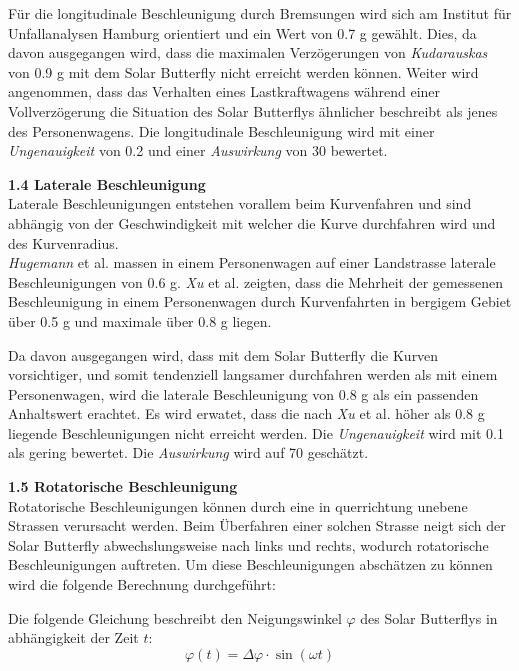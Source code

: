 \begin{description}
    Für die longitudinale Beschleunigung durch Bremsungen wird sich am Institut für Unfallanalysen Hamburg orientiert und ein Wert von 0.7 g gewählt. Dies, da davon ausgegangen wird, dass die maximalen Verzögerungen von \emph{Kudarauskas} von 0.9 g mit dem Solar Butterfly nicht erreicht werden können. Weiter wird angenommen, dass das Verhalten eines Lastkraftwagens während einer Vollverzögerung die Situation des Solar Butterflys ähnlicher beschreibt als jenes des Personenwagens.
    Die longitudinale Beschleunigung wird mit einer \emph{Ungenauigkeit} von 0.2 und einer \emph{Auswirkung} von 30 bewertet.

    \item \textbf{1.4 Laterale Beschleunigung}\\
    Laterale Beschleunigungen entstehen vorallem beim Kurvenfahren und sind abhängig von der Geschwindigkeit mit welcher die Kurve durchfahren wird und des Kurvenradius.\\
    \emph{Hugemann} et al. \cite{Kurv.1} massen in einem Personenwagen auf einer Landstrasse laterale Beschleunigungen von 0.6 g. \emph{Xu} et al. \cite{Kurv.2} zeigten, dass die Mehrheit der gemessenen Beschleunigung in einem Personenwagen durch Kurvenfahrten in bergigem Gebiet über 0.5 g und maximale über 0.8 g liegen.

    Da davon ausgegangen wird, dass mit dem Solar Butterfly die Kurven vorsichtiger, und somit tendenziell langsamer durchfahren werden als mit einem Personenwagen, wird die laterale Beschleunigung von 0.8 g als ein passenden Anhaltswert erachtet. Es wird erwatet, dass die nach \emph{Xu} et al. höher als 0.8 g liegende Beschleunigungen nicht erreicht werden. Die \emph{Ungenauigkeit} wird mit 0.1 als gering bewertet. Die \emph{Auswirkung} wird auf 70 geschätzt.

    \item \textbf{1.5 Rotatorische Beschleunigung}\\
    Rotatorische Beschleunigungen können durch eine in querrichtung unebene Strassen verursacht werden. Beim Überfahren einer solchen Strasse neigt sich der Solar Butterfly abwechslungsweise nach links und rechts, wodurch rotatorische Beschleunigungen auftreten. Um diese Beschleunigungen abschätzen zu können wird die folgende Berechnung durchgeführt:

    Die folgende Gleichung beschreibt den Neigungswinkel $\varphi$ des Solar Butterflys in abhängigkeit der Zeit $t$:
    \begin{equation}
      \varphi(t) = \Delta \varphi \cdot \sin \left(\omega t \right)
    \end{equation}


\end{description}
